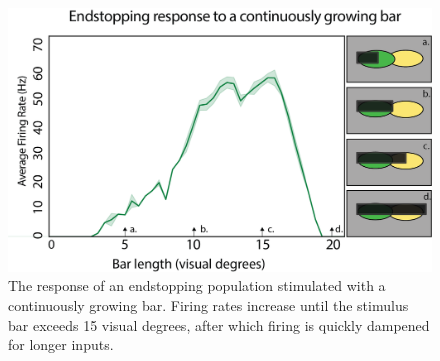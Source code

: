 \documentclass[12pt]{article}
\begin{document}
  \begin{figure}[H]
    \centering
    \includegraphics[width=1.0 \textwidth]{adjusted_figures/endstop_line_length.png}
    \caption{The response of an endstopping population stimulated with a continuously growing bar. Firing rates increase until the stimulus bar exceeds 15 visual degrees, after which firing is quickly dampened for longer inputs.}
    \label{fig:endstopping_length}
  \end{figure}
\end{document}
